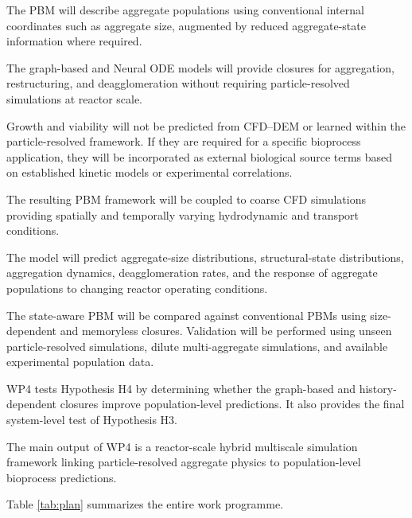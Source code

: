 \documentclass[11pt,a4paper,twoside]{scrartcl}
\begin{document}
The PBM will describe aggregate populations using conventional internal coordinates such as aggregate size, augmented by reduced aggregate-state information where required.

The graph-based and Neural ODE models will provide closures for aggregation, restructuring, and deagglomeration without requiring particle-resolved simulations at reactor scale.

Growth and viability will not be predicted from CFD--DEM or learned within the particle-resolved framework. If they are required for a specific bioprocess application, they will be incorporated as external biological source terms based on established kinetic models or experimental correlations.

The resulting PBM framework will be coupled to coarse CFD simulations providing spatially and temporally varying hydrodynamic and transport conditions.

The model will predict aggregate-size distributions, structural-state distributions, aggregation dynamics, deagglomeration rates, and the response of aggregate populations to changing reactor operating conditions.

The state-aware PBM will be compared against conventional PBMs using size-dependent and memoryless closures. Validation will be performed using unseen particle-resolved simulations, dilute multi-aggregate simulations, and available experimental population data.

WP4 tests Hypothesis H4 by determining whether the graph-based and history-dependent closures improve population-level predictions. It also provides the final system-level test of Hypothesis H3.

The main output of WP4 is a reactor-scale hybrid multiscale simulation framework linking particle-resolved aggregate physics to population-level bioprocess predictions.
\medskip 

Table \ref{tab:plan} summarizes the entire work programme.



\end{document}
